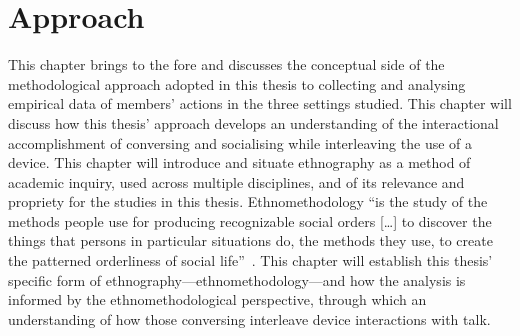 


\chapter{Approach}\label{ch:background approach}



\begin{revisedsubmission}
This chapter brings to the fore and discusses the conceptual side of the methodological approach adopted in this thesis to collecting and analysing empirical data of members' actions in the three settings studied.
This chapter will discuss how this thesis' approach develops an understanding of the interactional accomplishment of conversing and socialising while interleaving the use of a device.
This chapter will introduce and situate ethnography as a method of academic inquiry, used across multiple disciplines, and of its relevance and propriety for the studies in this thesis. 
Ethnomethodology ``is the study of the methods people use for producing recognizable social orders [\ldots] to discover the things that persons in particular situations do, the methods they use, to create the patterned orderliness of social life''~\citep[p. 6]{Garfinkel2002a}.
This chapter will establish this thesis' specific form of ethnography---ethnomethodology---and how the analysis is informed by the ethnomethodological perspective, through which an understanding of how those conversing interleave device interactions with talk.
\end{revisedsubmission}


